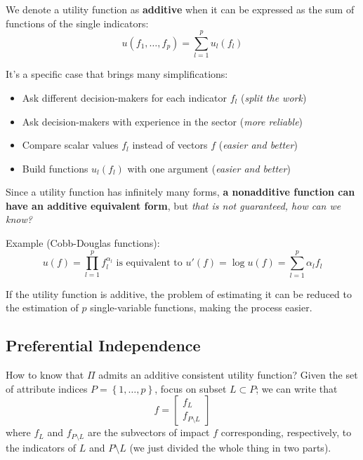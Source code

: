 \begin{definition}
	We denote a utility function as \textbf{additive} when it can be expressed as the sum of functions of the single indicators:
	$$ u(f_1, \dots, f_p) = \sum_{l = 1}^p u_l (f_l) $$
\end{definition}

It's a specific case that brings many simplifications:
\begin{itemize}
	\item Ask different decision-makers for each indicator $f_l$ (\textit{split the work})
	
	\item Ask decision-makers with experience in the sector (\textit{more reliable})
	
	\item Compare scalar values $f_l$ instead of vectors $f$ (\textit{easier and better})
	
	\item Build functions $u_l (f_l)$ with one argument (\textit{easier and better})
\end{itemize}

Since a utility function has infinitely many forms, \textbf{a nonadditive function can have an additive equivalent form}, but \textit{that is not guaranteed, how can we know?}

Example (Cobb-Douglas functions):
$$ u(f) = \prod_{l=1}^{p} f_l^{\alpha_l} \text{ is equivalent to } u'(f) = \log u (f) = \sum_{l = 1}^p \alpha_l f_l $$

If the utility function is additive, the problem of estimating it can be reduced to the estimation of $p$ single-variable functions, making the process easier.

\subsection{Preferential Independence}
\label{subsec:preferentialindependence}

How to know that $\Pi$ admits an additive consistent utility function? Given the set of attribute indices $P = \left\{1, \dots, p\right\}$, focus on subset $L \subset P$; we can write that
$$ f = \left[
\begin{array}{c}
	f_L \\
	f_{P\setminus L}
\end{array}
\right]$$
where $f_L$ and $f_{P\setminus L}$ are the subvectors of impact $f$ corresponding, respectively, to the indicators of $L$ and $P \setminus L$ (we just divided the whole thing in two parts).\\

